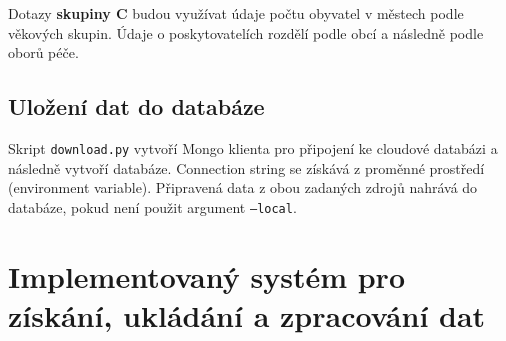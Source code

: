 \documentclass[11pt, a4paper]{article}
\theoremstyle{definition}
\theoremstyle{plain}
\begin{document}
Dotazy \textbf{skupiny C} budou využívat údaje počtu obyvatel v městech podle věkových skupin. Údaje o poskytovatelích rozdělí podle obcí a následně podle oborů péče.

\subsection{Uložení dat do databáze}
Skript \texttt{download.py} vytvoří Mongo klienta pro připojení ke cloudové databázi a následně vytvoří databáze. Connection string se získává z proměnné prostředí (environment variable). Připravená data z obou zadaných zdrojů nahrává do databáze, pokud není použit argument \texttt{--local}. 

\section{Implementovaný systém pro získání, ukládání a zpracování dat}
\end{document}
